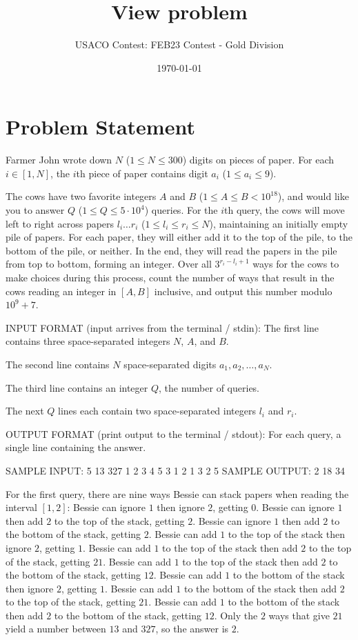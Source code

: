\documentclass[12pt]{article}
\title{View problem}
\author{USACO Contest: FEB23 Contest - Gold Division}
\date{\today}
\begin{document}
\maketitle

\section*{Problem Statement}


Farmer John wrote down  $N$ ($1\le N\le 300$) digits on pieces of paper. For
each $i\in [1,N]$, the $i$th piece of paper contains digit $a_i$
($1 \leq a_i \leq 9$). 

The cows have two favorite integers $A$ and $B$ ($1\le A\le B< 10^{18}$), and
would like you to answer $Q$ ($1\le Q\le 5\cdot 10^4$) queries. For the $i$th
query, the cows will move left to right across papers $l_i\dots r_i$
($1\le l_i\le r_i\le N$), maintaining an initially empty pile of papers.  For
each paper, they will either add it to the top of the pile, to the bottom of the
pile, or neither. In the end, they will read the papers in the pile from top to
bottom, forming an integer. Over all $3^{r_i-l_i+1}$ ways for the cows to make
choices during this process,  count the number of ways that result in the cows
reading an integer in $[A,B]$ inclusive, and output this number modulo $10^9+7$.

INPUT FORMAT (input arrives from the terminal / stdin):
The first line contains three space-separated integers $N$, $A$, and $B$. 

The second line contains $N$ space-separated digits $a_1, a_2, \dots, a_N$.

The third line contains an integer $Q$, the number of queries.

The next $Q$ lines each contain two space-separated integers $l_i$ and $r_i$.

OUTPUT FORMAT (print output to the terminal / stdout):
For each query, a single line containing the answer.

SAMPLE INPUT:
5 13 327
1 2 3 4 5
3
1 2
1 3
2 5
SAMPLE OUTPUT: 
2
18
34

For the first query, there are nine ways Bessie can stack papers when reading
the interval $[1, 2]$:
 Bessie can ignore $1$ then ignore $2$, getting $0$.  Bessie can
ignore $1$ then add $2$ to the top of the stack, getting $2$.  Bessie
can ignore $1$ then add $2$ to the bottom of the stack, getting $2$. 
Bessie can add $1$ to the top of the stack then ignore $2$, getting $1$.  Bessie can add $1$ to the top of the stack then add $2$ to the top of
the stack, getting $21$.  Bessie can add $1$ to the top of the stack
then add $2$ to the bottom of the stack, getting $12$.  Bessie
can add $1$ to the bottom of the stack then ignore $2$, getting $1$. 
Bessie can add $1$ to the bottom of the stack then add $2$ to the top of the
stack, getting $21$.  Bessie can add $1$ to the bottom of the stack
then add $2$ to the bottom of the stack, getting $12$. 
Only the $2$ ways that give $21$ yield a number between $13$ and $327$, so the
answer is $2$.
\end{document}
